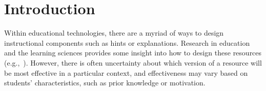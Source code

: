 \section{Introduction} %


Within educational technologies, there are a myriad of ways to design instructional components such as hints or explanations. Research in education and the learning sciences provides some insight into how to design these resources (e.g.,~\cite{shute2008focus,aleven2016help}). However, there is often uncertainty about which version of a resource will be most effective in a particular context, and effectiveness may vary based on students' characteristics, such as prior knowledge or motivation. 

